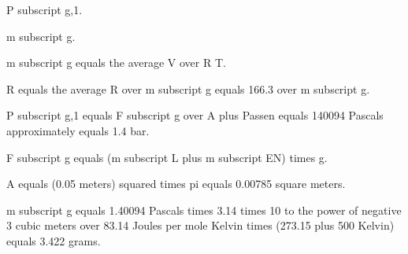 P subscript g,1.

m subscript g.

m subscript g equals the average V over R T.

R equals the average R over m subscript g equals 166.3 over m subscript g.

P subscript g,1 equals F subscript g over A plus Passen equals 140094 Pascals approximately equals 1.4 bar.

F subscript g equals (m subscript L plus m subscript EN) times g.

A equals (0.05 meters) squared times pi equals 0.00785 square meters.

m subscript g equals 1.40094 Pascals times 3.14 times 10 to the power of negative 3 cubic meters over 83.14 Joules per mole Kelvin times (273.15 plus 500 Kelvin) equals 3.422 grams.
